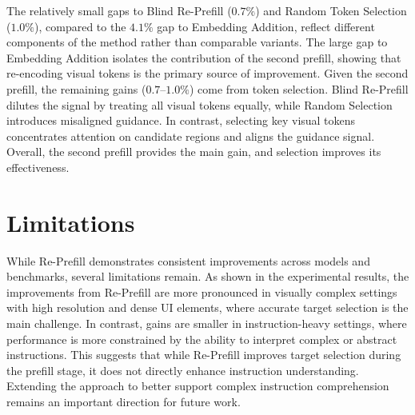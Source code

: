 \documentclass{article}
\begin{document}

The relatively small gaps to Blind Re-Prefill ($0.7\%$) and Random Token Selection ($1.0\%$), compared to the $4.1\%$ gap to Embedding Addition, reflect different components of the method rather than comparable variants. The large gap to Embedding Addition isolates the contribution of the second prefill, showing that re-encoding visual tokens is the primary source of improvement.
Given the second prefill, the remaining gains ($0.7\text{--}1.0\%$) come from token selection. Blind Re-Prefill dilutes the signal by treating all visual tokens equally, while Random Selection introduces misaligned guidance. In contrast, selecting key visual tokens concentrates attention on candidate regions and aligns the guidance signal. Overall, the second prefill provides the main gain, and selection improves its effectiveness.


\section{Limitations}
\label{app:limitations}

While Re-Prefill demonstrates consistent improvements across models and benchmarks, several limitations remain.
As shown in the experimental results, the improvements from Re-Prefill are more pronounced in visually complex settings with high resolution and dense UI elements, where accurate target selection is the main challenge. In contrast, gains are smaller in instruction-heavy settings, where performance is more constrained by the ability to interpret complex or abstract instructions. This suggests that while Re-Prefill improves target selection during the prefill stage, it does not directly enhance instruction understanding. Extending the approach to better support complex instruction comprehension remains an important direction for future work.

% 
\end{document}

